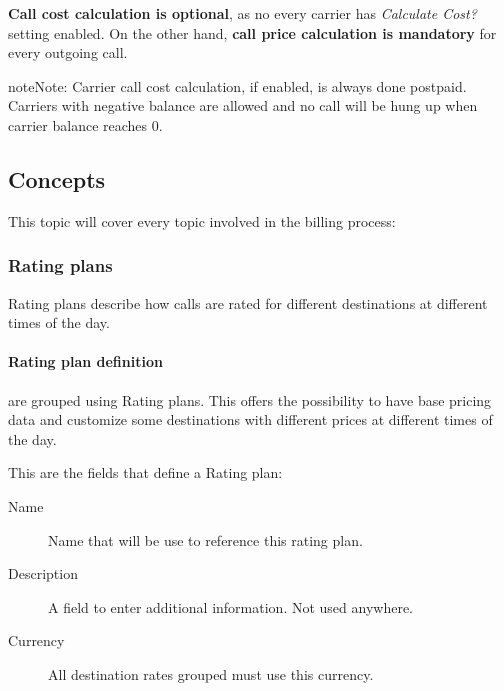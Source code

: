 \documentclass[letterpaper,10pt,english]{sphinxmanual}
\begin{document}
\textbf{Call cost calculation is optional}, as no every carrier has \emph{Calculate Cost?} setting enabled. On the other hand, \textbf{call
price calculation is mandatory} for every outgoing call.

\begin{notice}{note}{Note:}
Carrier call cost calculation, if enabled, is always done postpaid. Carriers with negative balance are allowed and
no call will be hung up when carrier balance reaches 0.
\end{notice}


\subsection{Concepts}
\label{administration_portal/brand/billing/index:concepts}
This topic will cover every topic involved in the billing process:


\subsubsection{Rating plans}
\label{administration_portal/brand/billing/rating_plans:rating-plans}\label{administration_portal/brand/billing/rating_plans::doc}
Rating plans describe how calls are rated for different destinations at different times of the day.


\paragraph{Rating plan definition}
\label{administration_portal/brand/billing/rating_plans:rating-plan-definition}
{\hyperref[administration_portal/brand/billing/destination_rates:destination\string-rates]{}} are grouped using Rating plans. This offers the possibility to have base pricing data and customize
some destinations with different prices at different times of the day.

This are the fields that define a Rating plan:
\begin{description}
\item[{Name}] \leavevmode{}\label{administration_portal/brand/billing/rating_plans:term-name}
Name that will be use to reference this rating plan.

\item[{Description}] \leavevmode{}\label{administration_portal/brand/billing/rating_plans:term-description}
A field to enter additional information. Not used anywhere.

\item[{Currency}] \leavevmode{}\label{administration_portal/brand/billing/rating_plans:term-currency}
All destination rates grouped must use this currency.

\end{description}
\end{document}
